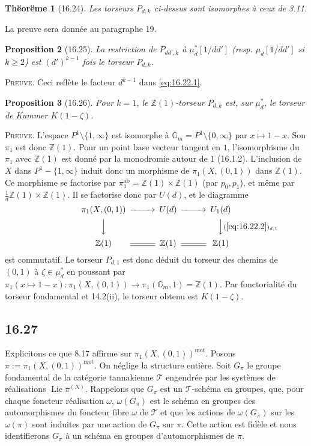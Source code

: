 \documentclass[12pt,a4paper]{article}
\theoremstyle{plain}
\newtheorem{theorem}{Th\"eor\"eme}[section]
\newtheorem{proposition}[theorem]{Proposition}
\theoremstyle{definition}
\theoremstyle{remark}
\DeclareMathOperator{\Lie}{Lie}
\newcommand{\mot}{\mathrm{mot}}
\newcommand{\Gm}{\mathbb{G}_m}
\newcommand{\ZZ}{\mathbb{Z}}
\begin{document}
\begin{theorem}[16.24]\label{thm:16.24}
Les torseurs $P_{d,k}$ ci-dessus sont isomorphes \`a ceux de 3.11.
\end{theorem}

La preuve sera donn\'ee au paragraphe 19.

\begin{proposition}[16.25]\label{prop:16.25}
La restriction de $P_{dd',k}$ \`a $\mu_d^*[1/dd']$ (resp.
$\mu_d[1/dd']$ si $k \geq 2$) est $(d')^{k-1}$ fois le torseur
$P_{d,k}$.
\end{proposition}

\noindent \textsc{Preuve.} Ceci refl\`ete le facteur $d^{k-1}$ dans
\eqref{eq:16.22.1}.

\begin{proposition}[16.26]\label{prop:16.26}
Pour $k=1$, le $\ZZ(1)$-torseur $P_{d,k}$ est, sur $\mu_d^*$, le
torseur de Kummer $K(1-\zeta)$.
\end{proposition}

\noindent \textsc{Preuve.} L'espace $P^1 \setminus \{1,\infty\}$ est
isomorphe \`a $\Gm = P^1 \setminus \{0,\infty\}$ par $x \mapsto 1-x$.
Son $\pi_1$ est donc $\ZZ(1)$. Pour un point base vecteur tangent en
$1$, l'isomorphisme du $\pi_1$ avec $\ZZ(1)$ est donn\'e par la
monodromie autour de $1$ (16.1.2). L'inclusion de $X$ dans
$P^1 - \{1,\infty\}$ induit donc un morphisme de $\pi_1(X,(0,1))$
dans $\ZZ(1)$. Ce morphisme se factorise par
$\pi_1^{\mathrm{ab}} = \ZZ(1) \times \ZZ(1)$ (par $p_0, p_1$), et
m\^eme par $\frac{1}{d}\ZZ(1) \times \ZZ(1)$. Il se factorise donc par
$U(d)$, et le diagramme
\[
\begin{CD}
\pi_1(X,(0,1)) @>>> U(d) @>>> U_1(d) \\
@VVV @. @VV{(\ref{eq:16.22.2})_{d,1}}V \\
\ZZ(1) @= \ZZ(1) @= \ZZ(1)
\end{CD}
\]
est commutatif. Le torseur $P_{d,1}$ est donc d\'eduit du torseur des
chemins de $(0,1)$ \`a $\zeta \in \mu_d^*$ en poussant par
$\pi_1(x \mapsto 1-x) : \pi_1(X,(0,1)) \to \pi_1(\Gm,1) = \ZZ(1)$. Par
fonctorialit\'e du torseur fondamental et 14.2(ii), le torseur obtenu
est $K(1-\zeta)$.

\subsection*{16.27}

Explicitons ce que 8.17 affirme sur $\pi_1(X,(0,1))^\mot$. Posons
$\pi := \pi_1(X,(0,1))^\mot$. On n\'eglige la structure enti\`ere. Soit
$G_\pi$ le groupe fondamental de la cat\'egorie tannakienne $\mathcal{T}$
engendr\'ee par les syst\`emes de r\'ealisations $\Lie \pi^{(N)}$.
Rappelons que $G_\pi$ est un $\mathcal{T}$-sch\'ema en groupes, que, pour
chaque foncteur r\'ealisation $\omega$, $\omega(G_\pi)$ est le sch\'ema en
groupes des automorphismes du foncteur fibre $\omega$ de $\mathcal{T}$ et que
les actions de $\omega(G_\pi)$ sur les $\omega(\pi)$ sont induites par une
action de $G_\pi$ sur $\pi$. Cette action est fid\`ele et nous
identifierons $G_\pi$ \`a un sch\'ema en groupes d'automorphismes de
$\pi$.
\end{document}
